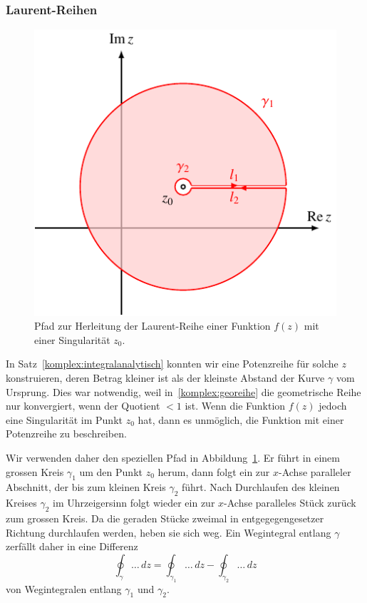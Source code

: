 \subsubsection{Laurent-Reihen}
\label{sssec:LaurentReihen}
\begin{figure}
\centering
\includegraphics{chapters/080-funktionentheorie/images/laurent.pdf}
\caption{Pfad zur Herleitung der Laurent-Reihe einer Funktion $f(z)$
mit einer Singularität $z_0$.
\label{komplex:laurentpfad}}
\end{figure}%
%
In Satz~\ref{komplex:integralanalytisch} konnten wir eine Potenzreihe für
solche $z$ konstruieren, deren Betrag kleiner ist als der kleinste Abstand
der Kurve $\gamma$ vom Ursprung.
Dies war notwendig, weil in~\eqref{komplex:georeihe} die geometrische Reihe
nur konvergiert, wenn der Quotient $<1$ ist.
Wenn die Funktion $f(z)$ jedoch eine Singularität im Punkt $z_0$ hat, dann
es unmöglich, die Funktion mit einer Potenzreihe zu beschreiben.

Wir verwenden daher den speziellen Pfad in Abbildung~\ref{komplex:laurentpfad}.
Er führt in einem grossen Kreis $\gamma_1$ um den Punkt $z_0$ herum,
dann folgt ein zur $x$-Achse paralleler Abschnitt, der bis zum kleinen
Kreis $\gamma_2$ führt.
Nach Durchlaufen des kleinen Kreises $\gamma_2$ im Uhrzeigersinn folgt wieder
ein zur $x$-Achse paralleles Stück zurück zum grossen Kreis.
Da die geraden Stücke zweimal in entgegegengesetzer Richtung durchlaufen
werden, heben sie sich weg.
Ein Wegintegral entlang $\gamma$ zerfällt daher in eine Differenz
\[
\oint_\gamma\dots\,dz
=
\oint_{\gamma_1}\dots\,dz
-
\oint_{\gamma_2}\dots\,dz
\]
von Wegintegralen entlang $\gamma_1$ und $\gamma_2$.

